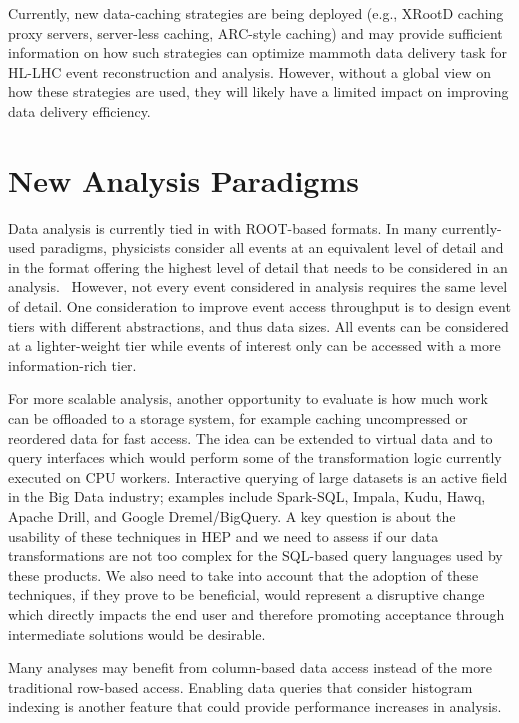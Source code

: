 \documentclass[12pt,a4paper]{article}
\begin{document}
Currently, new data-caching strategies are being deployed (e.g., XRootD
caching proxy servers, server-less caching, ARC-style caching) and may
provide sufficient information on how such strategies can optimize
mammoth data delivery task for HL-LHC event reconstruction and analysis.
However, without a global view on how these strategies are used, they
will likely have a limited impact on improving data delivery efficiency.

\section{New Analysis Paradigms}\label{new-analysis-paradigms}

Data analysis is currently tied in with ROOT-based formats. In many
currently-used paradigms, physicists consider all events at an
equivalent level of detail and in the format offering the highest level
of detail that needs to be considered in an analysis. ~However, not
every event considered in analysis requires the same level of detail.
One consideration to improve event access throughput is to design event
tiers with different abstractions, and thus data sizes. All events can
be considered at a lighter-weight tier while events of interest only can
be accessed with a more information-rich tier.

For more scalable analysis, another opportunity to evaluate is how much
work can be offloaded to a storage system, for example caching
uncompressed or reordered data for fast access. The idea can be extended
to virtual data and to query interfaces which would perform some of the
transformation logic currently executed on CPU workers. Interactive
querying of large datasets is an active field in the Big Data industry;
examples include Spark-SQL, Impala, Kudu, Hawq, Apache Drill, and Google
Dremel/BigQuery. A key question is about the usability of these
techniques in HEP and we need to assess if our data transformations are
not too complex for the SQL-based query languages used by these
products. We also need to take into account that the adoption of these
techniques, if they prove to be beneficial, would represent a disruptive
change which directly impacts the end user and therefore promoting
acceptance through intermediate solutions would be desirable.

Many analyses may benefit from column-based data access instead of the
more traditional row-based access. Enabling data queries that consider
histogram indexing is another feature that could provide performance
increases in analysis.
\end{document}
